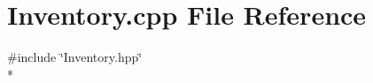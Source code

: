 \section{Inventory.\-cpp File Reference}
\label{_inventory_8cpp}
{\ttfamily \#include \char`\"{}Inventory.\-hpp\char`\"{}}\\*
